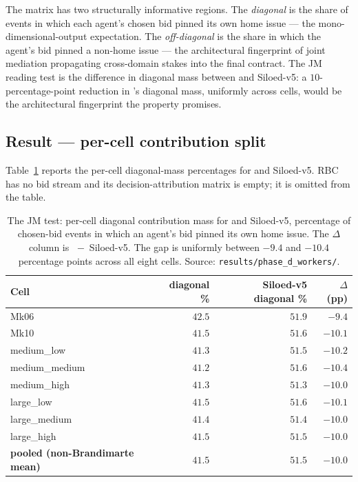 The matrix has two structurally informative regions. The
\emph{diagonal} is the share of events in which each agent's
chosen bid pinned its own home issue --- the mono-dimensional-output
expectation. The \emph{off-diagonal} is the share in which the
agent's bid pinned a non-home issue --- the architectural fingerprint
of joint mediation propagating cross-domain stakes into the final
contract. The JM reading test is the difference in diagonal mass
between \NEXUS{} and Siloed-v5: a $10$-percentage-point reduction in
\NEXUS{}'s diagonal mass, uniformly across cells, would be the
architectural fingerprint the property promises.

\subsection*{Result --- per-cell contribution split}

Table~\ref{tab:val-attribution} reports the per-cell diagonal-mass
percentages for \NEXUS{} and Siloed-v5. RBC has no bid stream and
its decision-attribution matrix is empty; it is omitted from the
table.

\begin{table}[ht]
\centering
\caption{The JM test: per-cell diagonal contribution mass for
\NEXUS{} and Siloed-v5, percentage of chosen-bid events in which an
agent's bid pinned its own home issue. The $\Delta$ column is
\NEXUS{}~$-$~Siloed-v5. The gap is uniformly between $-9.4$ and
$-10.4$ percentage points across all eight cells. Source:
\texttt{results/phase\_d\_workers/}.}
\label{tab:val-attribution}
\small
\begin{tabularx}{\textwidth}{@{}X r r r@{}}
\toprule
\textbf{Cell} & \textbf{\NEXUS{} diagonal \%}
              & \textbf{Siloed-v5 diagonal \%}
              & \textbf{$\Delta$ (pp)} \\
\midrule
Mk06            & $42.5$ & $51.9$ & $-9.4$ \\
Mk10            & $41.5$ & $51.6$ & $-10.1$ \\
medium\_low     & $41.3$ & $51.5$ & $-10.2$ \\
medium\_medium  & $41.2$ & $51.6$ & $-10.4$ \\
medium\_high    & $41.3$ & $51.3$ & $-10.0$ \\
large\_low      & $41.5$ & $51.6$ & $-10.1$ \\
large\_medium   & $41.4$ & $51.4$ & $-10.0$ \\
large\_high     & $41.5$ & $51.5$ & $-10.0$ \\
\midrule
\textbf{pooled (non-Brandimarte mean)} & $\mathbf{41.5}$ & $\mathbf{51.5}$ & $\mathbf{-10.0}$ \\
\bottomrule
\end{tabularx}
\end{table}

